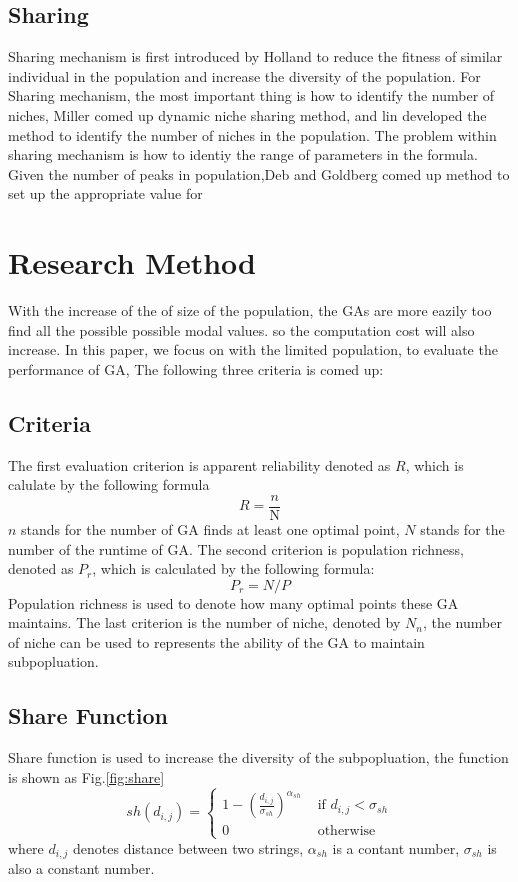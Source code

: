 \documentclass[smallextended]{svjour3}       %
\begin{document}
\begin{multicols}{2}
\subsection{Sharing}
Sharing mechanism is first introduced by Holland \cite{miller1996genetic} to
reduce the fitness of similar individual in the population and increase the
diversity of the population. For Sharing mechanism, the most important thing is
how to identify the number of niches, Miller comed up dynamic niche sharing
method, and lin developed the method to identify the number of niches in the
population.\cite{lin2002niche} The problem within sharing mechanism is how to
identiy the range of parameters in the formula. Given the number of peaks in
population,Deb and Goldberg comed up method to set up the appropriate value for




\section{Research Method}
With the increase of the of size of the population, the GAs are more eazily too
find all the possible possible modal values. so the computation cost will also
increase. In this paper, we focus on with the limited population, to evaluate
the performance of GA, The following three criteria is comed up: 
\subsection{Criteria}
The first evaluation criterion is apparent reliability denoted as $R$, which is
calulate by the following formula
\begin{equation}
R = \frac{n}{\text{N}}
\end{equation}
$n$ stands for the number of GA finds at least one optimal point, $N$ stands for
the number of the runtime of GA. \newline
The second criterion is population richness, denoted as $P_{r}$, which is
calculated by the following formula:
$$
P_{r} = N/P
$$
Population richness is used to denote how many optimal points these GA
maintains. \newline 
The last criterion is the number of niche, denoted by $N_{n}$, the
number of niche can be used to represents the ability of the GA to maintain
subpopluation. \newline
\subsection{Share Function}
Share function is used to increase the diversity of the subpopluation, the
function is shown as Fig.\ref{fig:share}
\begin{equation}
s h\left(d_{i, j}\right)=\left\{\begin{array}{ll}{1-\left(\frac{d_{i, j}}{\sigma_{s h}}\right)^{\alpha_{s h}}} 
    & {\text { if } d_{i, j}<\sigma_{s h}} \\ 
{0} & {\text { otherwise }}\end{array}\right.
\end{equation}
where $d_{i, j}$ denotes distance between two strings, $\alpha_{sh}$ is a contant number,
$\sigma_{sh}$ is also a constant number.


\end{multicols}
\end{document}

